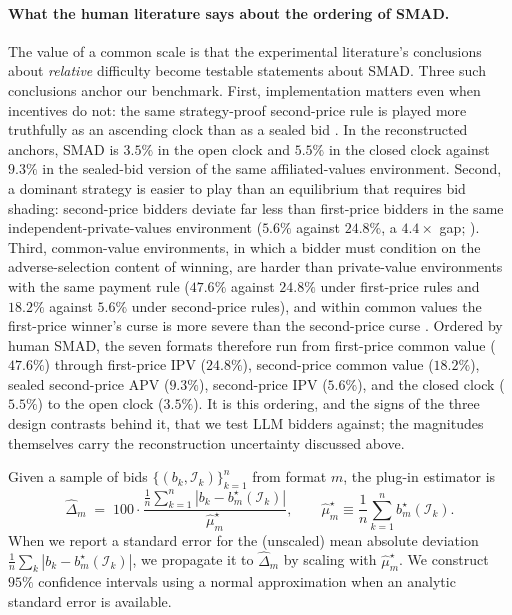 \documentclass[acmsmall,screen,review]{acmart}
\newcommand{\rev}[1]{{\color{blue}#1}}
\newcommand{\rev}[1]{#1}
\begin{document}
\paragraph{What the human literature says about the ordering of SMAD.}
The value of a common scale is that the experimental literature's conclusions about \emph{relative} difficulty become testable statements about SMAD. Three such conclusions anchor our benchmark. First, implementation matters even when incentives do not: the same strategy-proof second-price rule is played more truthfully as an ascending clock than as a sealed bid \citep{li2017obviously, breitmoser2022obviousness}. In the reconstructed anchors, SMAD is $3.5\%$ in the open clock and \rev{$5.5\%$} in the closed clock against $9.3\%$ in the sealed-bid version of the same affiliated-values environment. Second, a dominant strategy is easier to play than an equilibrium that requires bid shading: second-price bidders deviate far less than first-price bidders in the same independent-private-values environment ($5.6\%$ against $24.8\%$, a $4.4\times$ gap; \citealp{kagel1993independent}). Third, common-value environments, in which a bidder must condition on the adverse-selection content of winning, are harder than private-value environments with the same payment rule ($47.6\%$ against $24.8\%$ under first-price rules and $18.2\%$ against $5.6\%$ under second-price rules), and within common values the first-price winner's curse is more severe than the second-price curse \citep{kagel1986winner, levin1996revenue}. Ordered by human SMAD, the seven formats therefore run from first-price common value ($47.6\%$) through first-price IPV ($24.8\%$), second-price common value ($18.2\%$), sealed second-price APV ($9.3\%$), \rev{second-price IPV ($5.6\%$), and the closed clock ($5.5\%$)} to the open clock ($3.5\%$). It is this ordering, and the signs of the three design contrasts behind it, that we test LLM bidders against; the magnitudes themselves carry the reconstruction uncertainty discussed above.


Given a sample of bids $\{(b_k,\mathcal I_k)\}_{k=1}^n$ from format $m$, the plug-in estimator is
\[
\widehat{\Delta}_m
\;=\;
100 \cdot
\frac{\frac{1}{n}\sum_{k=1}^{n}\left|b_k-b_m^\star(\mathcal I_k)\right|}
{\widehat{\mu}_m^\star},
\qquad
\widehat{\mu}_m^\star \equiv \frac{1}{n}\sum_{k=1}^{n} b_m^\star(\mathcal I_k).
\]
When we report a standard error for the (unscaled) mean absolute deviation $\frac{1}{n}\sum_k |b_k-b_m^\star(\mathcal I_k)|$, we propagate it to $\widehat{\Delta}_m$ by scaling with $\widehat{\mu}_m^\star$. We construct $95\%$ confidence intervals using a normal approximation when an analytic standard error is available.
\end{document}
